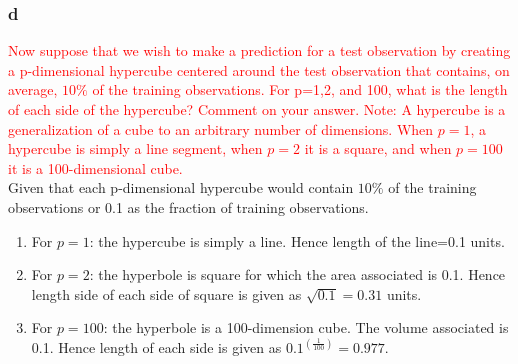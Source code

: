 \documentclass{article}[a4paper]
\begin{document}
\subsubsection*{d}
\textcolor{red}{Now suppose that we wish to make a prediction for a test observation by creating a p-dimensional hypercube centered around the test observation that contains, on average, $10\%$ of the training observations. For p=1,2, and 100, what is the length of each side of the hypercube? Comment on your answer. Note: A hypercube is a generalization of a cube to an arbitrary number of dimensions. When $p=1$, a hypercube is simply a line segment, when $p=2$ it is a square, and when $p=100$ it is a 100-dimensional cube.}\\
Given that each p-dimensional hypercube would contain $10\%$ of the training observations or 0.1 as the fraction of training observations.
\begin{enumerate}
    \item For $p=1$: the hypercube is simply a line. Hence length of the line=0.1 units.
    \item For $p=2$: the hyperbole is square for which the area associated is 0.1. Hence length side of each side of square is given as $\sqrt{0.1} = 0.31$ units.
    \item For $p=100$: the hyperbole is a 100-dimension cube. The volume associated is 0.1. Hence length of each side is given as $0.1^(\frac{1}{100}) = 0.977$.
\end{enumerate}


\end{document}
